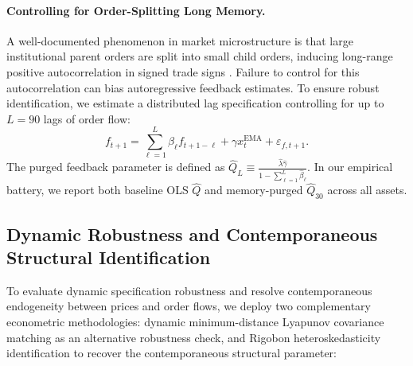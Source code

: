\documentclass[12pt]{article}
\theoremstyle{definition}
\theoremstyle{remark}
\begin{document}
\paragraph{Controlling for Order-Splitting Long Memory.}
A well-documented phenomenon in market microstructure is that large institutional parent orders are split into small child orders, inducing long-range positive autocorrelation in signed trade signs \citep{bouchaud2004fluctuations,cont2014}. Failure to control for this autocorrelation can bias autoregressive feedback estimates. To ensure robust identification, we estimate a distributed lag specification controlling for up to $L=90$ lags of order flow:
\begin{equation}
f_{t+1} = \sum_{\ell=1}^L \beta_\ell f_{t+1-\ell} + \gamma x_t^{\text{EMA}} + \varepsilon_{f, t+1}.
\label{eq:Q_robust}
\end{equation}
The purged feedback parameter is defined as $\hat{Q}_L \equiv \frac{\hat{\lambda} \hat{\gamma}}{1 - \sum_{\ell=1}^L \hat{\beta}_\ell}$. In our empirical battery, we report both baseline OLS $\hat{Q}$ and memory-purged $\hat{Q}_{30}$ across all assets.

\subsection{Dynamic Robustness and Contemporaneous Structural Identification}
To evaluate dynamic specification robustness and resolve contemporaneous endogeneity between prices and order flows, we deploy two complementary econometric methodologies: dynamic minimum-distance Lyapunov covariance matching as an alternative robustness check, and Rigobon heteroskedasticity identification to recover the contemporaneous structural parameter:
\end{document}
